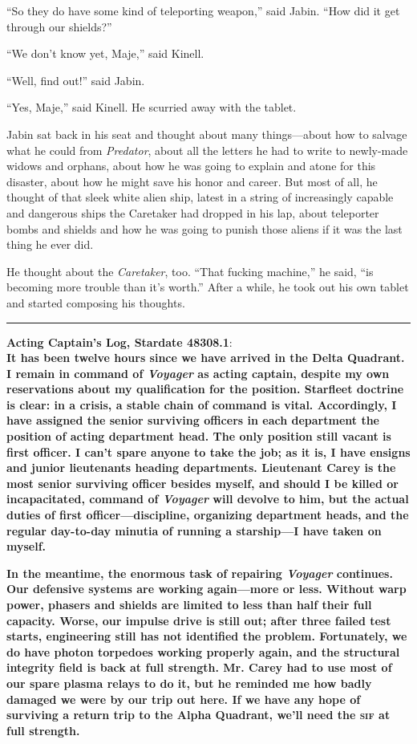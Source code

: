 \documentclass[twoside,letterpaper,12pt]{memoir}
\begin{document}
``So they do have some kind of teleporting weapon,'' said Jabin. ``How did it get through our shields?''

``We don't know yet, Maje,'' said Kinell.

``Well, find out!'' said Jabin.

``Yes, Maje,'' said Kinell. He scurried away with the tablet.

Jabin sat back in his seat and thought about many things---about how to salvage what he could from \textit{Predator}, about all the letters he had to write to newly-made widows and orphans, about how he was going to explain and atone for this disaster, about how he might save his honor and career. But most of all, he thought of that sleek white alien ship, latest in a string of increasingly capable and dangerous ships the Caretaker had dropped in his lap, about teleporter bombs and shields and how he was going to punish those aliens if it was the last thing he ever did.

He thought about the \textit{Caretaker}, too. ``That fucking machine,'' he said, ``is becoming more trouble than it's worth.'' After a while, he took out his own tablet and started composing his thoughts.

\fancybreak{\rule{3cm}{0.4 pt}}
\noindent\textbf{Acting Captain's Log, Stardate 48308.1}:\\

\textbf{It has been twelve hours since we have arrived in the Delta Quadrant. I remain in command of \textit{Voyager} as acting captain, despite my own reservations about my qualification for the position. Starfleet doctrine is clear: in a crisis, a stable chain of command is vital. Accordingly, I have assigned the senior surviving officers in each department the position of acting department head. The only position still vacant is first officer. I can't spare anyone to take the job; as it is, I have ensigns and junior lieutenants heading departments. Lieutenant Carey is the most senior surviving officer besides myself, and should I be killed or incapacitated, command of \textit{Voyager} will devolve to him, but the actual duties of first officer---discipline, organizing department heads, and the regular day-to-day minutia of running a starship---I have taken on myself.}

\textbf{In the meantime, the enormous task of repairing \textit{Voyager} continues. Our defensive systems are working again---more or less. Without warp power, phasers and shields are limited to less than half their full capacity. Worse, our impulse drive is still out; after three failed test starts, engineering still has not identified the problem. Fortunately, we do have photon torpedoes working properly again, and the structural integrity field is back at full strength. Mr. Carey had to use most of our spare plasma relays to do it, but he reminded me how badly damaged we were by our trip out here. If we have any hope of surviving a return trip to the Alpha Quadrant, we'll need the \textsc{sif} at full strength.}
\end{document}
